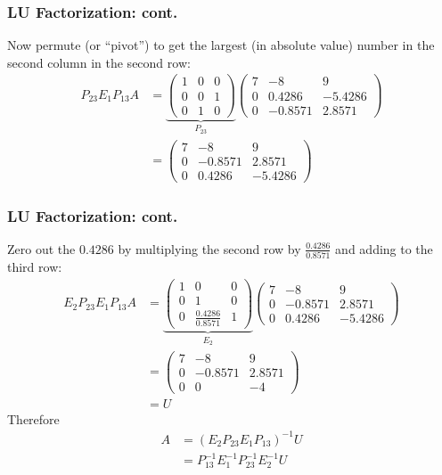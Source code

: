\documentclass{beamer}
\begin{document}
\begin{frame}\frametitle{LU Factorization: cont.}
	Now permute (or ``pivot'') to get the largest (in absolute value) number in the second column in the second row:
	\begin{align*}
		P_{23}E_1P_{13}A &= 
			\underbrace{\begin{pmatrix}
    			1 & 0 & 0\\
    			0 & 0 & 1\\
    			0 & 1 & 0
  			\end{pmatrix}}_{P_{23}}
			\begin{pmatrix}
    			7 & -8 & 9\\
    			0 & 0.4286 & -5.4286\\
    			0 & -0.8571 & 2.8571
  			\end{pmatrix} \\
		&=
			\begin{pmatrix}
    			7 & -8 & 9\\
    			0 & -0.8571 & 2.8571\\
    			0 & 0.4286 & -5.4286
  			\end{pmatrix}
	\end{align*}
\end{frame}


\begin{frame}\frametitle{LU Factorization: cont.}
	Zero out the $0.4286$ by multiplying the second row by 
	$\frac{0.4286}{0.8571}$ and adding to the third row:
	\begin{align*}
		E_2 P_{23} E_1 P_{13} A 
		&= 
			\underbrace{
				\begin{pmatrix}
    				1 & 0 & 0 \\
    				0 & 1 & 0 \\
    				0 & \frac{0.4286}{0.8571} & 1
  				\end{pmatrix}
  			}_{E_2}
			\begin{pmatrix}
    			7 & -8 & 9\\
    			0 & -0.8571 & 2.8571\\
    			0 & 0.4286 & -5.4286
  			\end{pmatrix} \\
		&=
			\begin{pmatrix}
   				7 & -8 & 9\\
    			0 & -0.8571 & 2.8571\\
    			0 & 0 & -4
  			\end{pmatrix} \\ 
  		&= U 
	\end{align*}
	Therefore
	\begin{align*}
		A &= (E_2P_{23}E_1P_{13})^{-1}U \\
		  &= P_{13}^{-1}E_1^{-1}P_{23}^{-1}E_2^{-1} U 
	\end{align*}
\end{frame}
\end{document}
